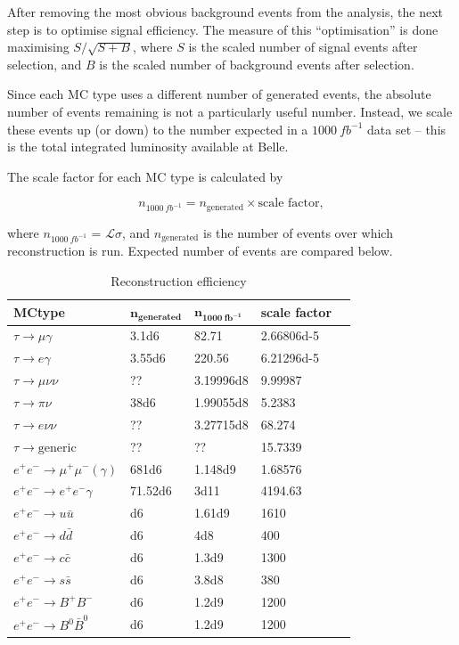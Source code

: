\documentclass[12pt,a4paper]{article} %
\begin{document}
After removing the most obvious background events from the analysis, the next step is to optimise signal efficiency. The measure of this ``optimisation'' is done maximising $S/\sqrt{S+B}$, where $S$ is the scaled number of signal events after selection, and $B$ is the scaled number of background events after selection.

Since each MC type uses a different number of generated events, the absolute number of events remaining is not a particularly useful number. Instead, we scale these events up (or down) to the number expected in a $\SI{1000}{fb^{-1}}$ data set – this is the total integrated luminosity available at Belle.

The scale factor for each MC type is calculated by

\begin{equation}
n_{\SI{1000}{fb^{-1}}} = n_{\text{generated}} \times \text{scale factor},
\end{equation}

where $n_{\SI{1000}{fb^{-1}}}$ = $\mathcal{L} \sigma$, and $n_{\text{generated}}$ is the number of events over which reconstruction is run. Expected number of events are compared below.


\begin{table}[h]
\centering
\begin{tabular}{lllll}
\textbf{MCtype} & $\mathbf{n_{\text{generated}}}$ & $\mathbf{n_{\SI{1000}{fb^{-1}}}}$ & 
\textbf{scale factor}\\\hline
\rowcolor[HTML]{EFEFEF} 
$\tau \to \mu\gamma$ & \num{3.1d6} & 82.71 & \num{2.66806d-5}\\
\rowcolor[HTML]{EFEFEF} 
$\tau \to e\gamma$ & \num{3.55d6} & 220.56 & \num{6.21296d-5} \\       
$\tau \to \mu\nu\nu$ & ?? & \num{3.19996d8} & 9.99987\\
$\tau \to \pi\nu$ & \num{38d6} & \num{1.99055d8} & 5.2383 \\
$\tau \to e\nu\nu$ & ?? & \num{3.27715d8} & 68.274 \\
$\tau \to \text{generic}$ & ?? & ?? & 15.7339  \\
$e^+e^- \to \mu^+\mu^-(\gamma)$ & \num{681d6} & \num{1.148d9} & 1.68576 \\
$e^+e^- \to e^+e^-\gamma$ & \num{71.52d6} & \num{3d11} & 4194.63 \\
$e^+e^- \to u\bar{u}$ & \num{d6} & \num{1.61d9} & 1610 \\
$e^+e^- \to d\bar{d}$ & \num{d6} & \num{4d8} & 400 \\
$e^+e^- \to c\bar{c}$ & \num{d6} & \num{1.3d9} & 1300 \\
$e^+e^- \to s\bar{s}$ & \num{d6} & \num{3.8d8} & 380 \\
$e^+e^- \to B^+B^-$ & \num{d6} & \num{1.2d9} & 1200 \\
$e^+e^- \to B^0\bar{B}^0$ & \num{d6} & \num{1.2d9} & 1200
\end{tabular}
\caption{Reconstruction efficiency}
\label{my-label}
\end{table}
\end{document}
